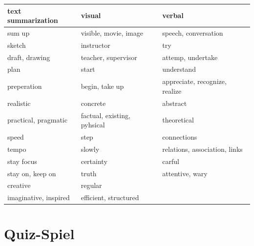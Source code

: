 \begin{longtable}{|m{4cm}|m{4.0cm}|m{4.0cm}|}
  \hline   
  \rowcolor[HTML]{EFEFEF} 
  \centering text summarization & \centering visual & \centering \arraybackslash verbal \\ \hline  
  sum up & visible, movie, image & speech, conversation \\\hline  \hline  
  
  \rowcolor[HTML]{EFEFEF} 
  \centering sketch & \centering instructor &\centering \arraybackslash  try\\ \hline  
  draft, drawing &  teacher, supervisor & attemp, undertake \\\hline  \hline  
  
  \rowcolor[HTML]{EFEFEF} 
  \centering plan & \centering start &\centering \arraybackslash  understand\\ \hline  
   preperation &  begin, take up & appreciate, recognize, realize  \\\hline  \hline
   
   \rowcolor[HTML]{EFEFEF} 
   \centering realistic & \centering concrete & \centering \arraybackslash  abstract\\ \hline  
   practical, pragmatic  &  factual, existing, pyhsical & theoretical \\\hline  \hline  

   \rowcolor[HTML]{EFEFEF} 
   \centering speed & \centering step &   \centering \arraybackslash connections\\ \hline  
   tempo  & slowly & relations, association, links  \\\hline  \hline  

   \rowcolor[HTML]{EFEFEF}
   \centering stay focus & \centering certainty &   \centering \arraybackslash carful\\\hline
   stay on, keep on & truth & attentive, wary\\\hline  \hline 

   \rowcolor[HTML]{EFEFEF}  
   \centering creative &   \centering \arraybackslash regular & \\ \hline 
   imaginative, inspired & efficient, structured   &\\ \hline  
  \end{longtable}



\chapter{Quiz-Spiel} 

